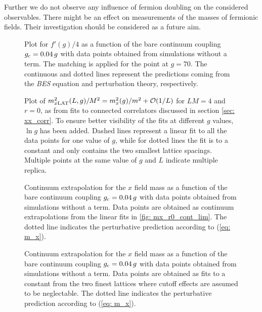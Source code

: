 Further we do not observe any influence of fermion doubling on the considered observables. There might be an effect on measurements of the masses of fermionic fields. Their investigation should be considered as a future aim.
%
%
%
\begin{figure}
\centering

\caption{Plot for $f'(g)/4$ as a function of the bare continuum coupling $g_{\rm c}=0.04\,g$ with data points obtained from simulations without a  term. The matching is applied for the point at $g=70$. The continuous and dotted lines represent the predictions coming from the \textit{BES} equation and perturbation theory, respectively.
\label{fig: f_prime_r0}}
\end{figure}
%
%
%
\begin{figure}
\centering

\caption{Plot of $m_{x\rm LAT}^{2}(L,g)/M^{2}= m_{x}^{2}(g)/m^{2}+\mathcal{O}(1/L)$ for $LM=4$ and $r=0$, as from fits to connected correlators discussed in section \ref{sec: xx_corr}. To ensure better visibility of the fits at different $g$ values, $\ln g$ has been added. Dashed lines represent a linear fit to all the data points for one value of $g$, while for dotted lines the fit is to a constant and only contains the two smallest lattice spacings. Multiple points at the same value of $g$ and $L$ indicate multiple replica.
\label{fig: mx_r0_cont_lim}}
\end{figure}
%
%
%
\begin{figure}
\centering

\caption{Continuum extrapolation for the $x$ field mass as a function of the bare continuum coupling $g_{\rm c}=0.04\,g$ with data points obtained from simulations without a  term. Data points are obtained as continuum extrapolations from the linear fits in \autoref{fig: mx_r0_cont_lim}. The dotted line indicates the perturbative prediction according to (\ref{eq: m_x}).
\label{fig: mx_vs_g_r0}}
\end{figure}
%
%
%
\begin{figure}
\centering

\caption{Continuum extrapolation for the $x$ field mass as a function of the bare continuum coupling $g_{\rm c}=0.04\,g$ with data points obtained from simulations without a  term. Data points are obtained as fits to a constant from the two finest lattices where cutoff effects are assumed to be neglectable. The dotted line indicates the perturbative prediction according to (\ref{eq: m_x}).
\label{fig: mx_vs_g_r0_plateau}}
\end{figure}
%
%
%

